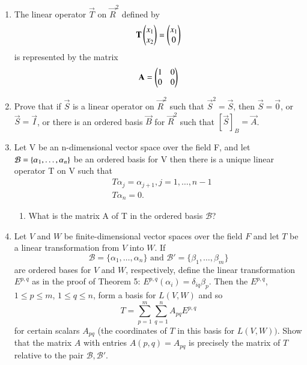 \begin{enumerate}[label=\thesubsection.\arabic*.,ref=\thesubsection.\theenumi]
\item The linear operator $\vec{T}$ on $\vec{R}^2$ defined by 
\begin{align}
	\mathbf{T}\begin{pmatrix}x_1\\x_2\end{pmatrix}=\begin{pmatrix}x_1\\0\end{pmatrix}
\end{align}
is represented by the matrix
\begin{align}
	\mathbf{A}=\begin{pmatrix}1&0\\
		       0&0\end{pmatrix}
\end{align}
\item Prove that if $\vec{S}$ is a linear operator on $\vec{R}^2$ such that $\vec{S}^2=\vec{S}$, 
then $\vec{S}=\vec{0}$, or $\vec{S}=\vec{I}$, or there is an ordered basis $\vec{B}$ for $\vec{R}^2$ 
such that $[\vec{S}]_B=\vec{A}$.
%
\\
\solution

\item Let V be an n-dimensional vector space over the field F, and let $\mathcal{B} = \left\{\alpha_1,\ldots, \alpha_n\right\}$ be an ordered basis for V then there is a unique linear operator T on V such that 
\begin{align}
   &T\alpha_{j} = \alpha_{j+1},  j=1,\ldots,n-1 \\
   &T\alpha_n = 0. 
\end{align}
%
\begin{enumerate}
\item What is the matrix A of T in the ordered basis $\mathcal{B}$?
\\
\solution

\end{enumerate}
\item Let $V$ and $W$ be finite-dimensional vector spaces over the field $F$ and let $T$ be a linear transformation from $V$ into $W$. If
\begin{equation}
	\mathcal{B} = \{\alpha_1, \dots, \alpha_n\} \text{ and } \mathcal{B}' = \{\beta_1, \dots, \beta_m\}
\end{equation}
are ordered bases for $V$ and $W$, respectively, define the linear transformation $E^{p,q}$ as in the proof of Theorem 5: $E^{p,q}(\alpha_i) = \delta_{iq}\beta_p$. Then the $E^{p,q}$, $1 \leq p \leq m$, $1 \leq q \leq n$, form a basis for $L(V,W)$ and so
\begin{equation}
	T = \displaystyle \sum_{p=1}^m \displaystyle \sum_{q=1}^n A_{pq}E^{p,q}
\end{equation} 
for certain scalars $A_{pq}$ (the coordinates of $T$ in this basis for $L(V,W))$. Show that the matrix $A$ with entries $A(p,q) = A_{pq}$ is precisely the matrix of $T$ relative to the pair $\mathcal{B},\mathcal{B}'$.
%
\\
\solution


\end{enumerate}
